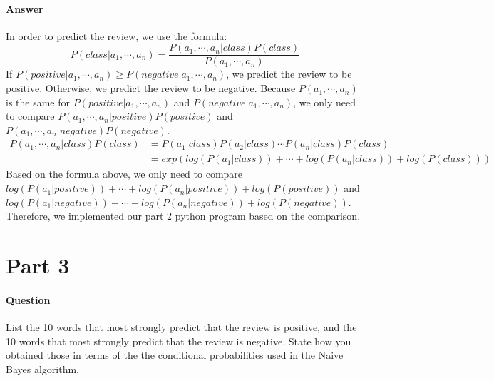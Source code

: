 \documentclass[11pt,twoside]{article}
\begin{document}
\paragraph{Answer}
In order to predict the review, we use the formula:
\[P(class | a_1, \cdots, a_n) = \frac{P(a_1, \cdots, a_n | class) P(class)}{P(a_1, \cdots, a_n)}\]
If $P(positive|a_1, \cdots, a_n) \geq P(negative|a_1, \cdots, a_n)$, we predict the review to be positive. Otherwise, we predict the review to be negative. Because $P(a_1, \cdots, a_n)$ is the same for $P(positive|a_1, \cdots, a_n)$ and $P(negative|a_1, \cdots, a_n)$, we only need to compare $P(a_1, \cdots, a_n | positive) P(positive)$ and\\ $P(a_1, \cdots, a_n | negative) P(negative)$.
\begin{align*}
P(a_1, \cdots, a_n | class) P(class) &= P(a_1|class) P(a_2|class)\cdots P(a_n|class)P(class)\\
&= exp(log(P(a_1|class))+\cdots+log(P(a_n|class))+log(P(class)))
\end{align*}
Based on the formula above, we only need to compare $log(P(a_1|positive))+\cdots+log(P(a_n|positive))+log(P(positive))$ and $log(P(a_1|negative))+\cdots+log(P(a_n|negative))+log(P(negative))$. Therefore, we implemented our part 2 python program based on the comparison.
\clearpage

\section*{Part 3}

\paragraph{Question}
List the 10 words that most strongly predict that the review is positive, and the 10 words that most strongly predict that the review is negative. State how you obtained those in terms of the the conditional probabilities used in the Naive Bayes algorithm.
\end{document}
